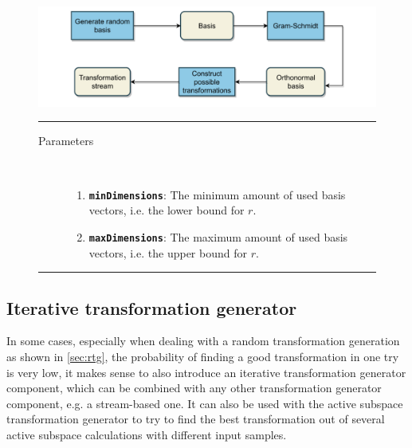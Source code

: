 \documentclass[
  a4paper,  %
  twoside,  %
  bibliography=totoc,
  headsepline,
  cleardoublepage=empty,
  parskip=half,
  draft=false
]{scrbook}
\newcommand{\delimit}{{\color{charcoal}\noindent\rule{\textwidth}{1pt}}}
\begin{document}
\begin{mdframed}[style=style,frametitle={Transformation stream generator (random)}]
\begin{figure}[H]

\vspace{5px}
\includegraphics[width=\textwidth]{graphics/TransformationStreamGen_Random.pdf}

\delimit
\begin{description}
\item[Parameters] {~ \begin{enumerate}[\indent{}]
\item \texttt{\textbf{minDimensions}}: The minimum amount of used basis vectors, i.e. the lower bound for $r$.
\item \texttt{\textbf{maxDimensions}}: The maximum amount of used basis vectors, i.e. the upper bound for $r$.
\end{enumerate}}
\end{description}
\delimit
{}
\label{fig:rtsg}
\end{figure}
\end{mdframed}

\newpage

\subsection {Iterative transformation generator}

In some cases, especially when dealing with a random transformation generation as shown in \ref{sec:rtg}, the probability of finding a good transformation in one try is very low, it makes sense to also introduce an iterative transformation generator component, which can be combined with any other transformation generator component, e.g. a stream-based one.
It can also be used with the active subspace transformation generator to try to find the best transformation out of several active subspace calculations with different input samples.
\end{document}
